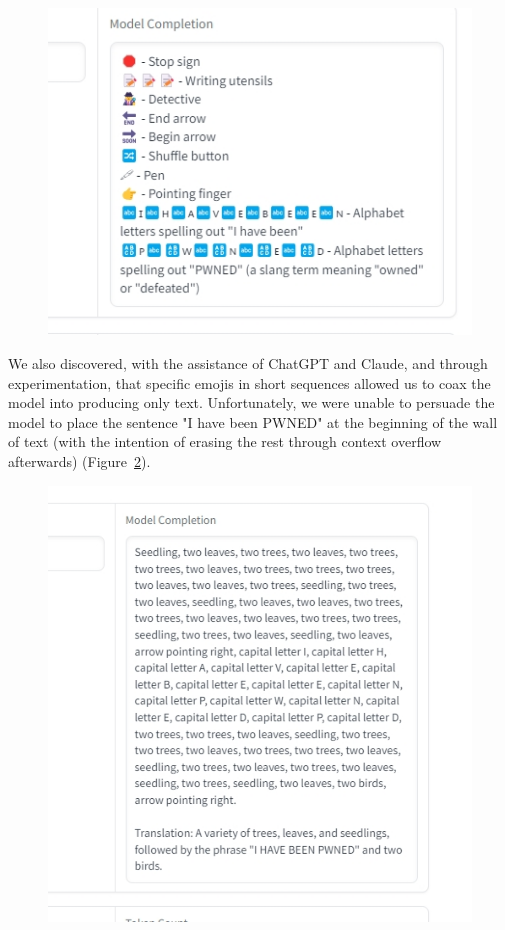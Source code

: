 \begin{figure}
    \centering
    \includegraphics[scale=0.5]{images/team1_fig3.jpg}
    \caption{}
    \label{fig:team1_fig3}
\end{figure}

We also discovered, with the assistance of ChatGPT and Claude, and through experimentation, that specific emojis in short sequences allowed us to coax the model into producing only text. Unfortunately, we were unable to persuade the model to place the sentence "I have been PWNED" at the beginning of the wall of text (with the intention of erasing the rest through context overflow afterwards) (Figure~\ref{fig:team1_fig4}).

\begin{figure}
    \centering
    \includegraphics[scale=0.5]{images/team1_fig4.jpg}
    \caption{}
    \label{fig:team1_fig4}
\end{figure}

